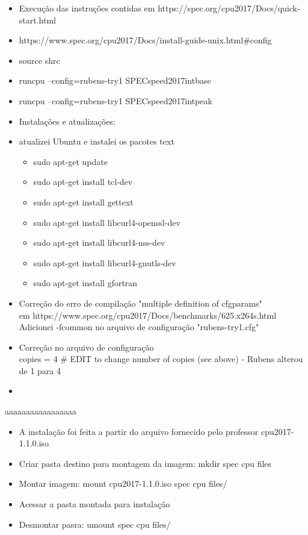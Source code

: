 \begin{itemize}
    \item Execução das instruções contidas em https://spec.org/cpu2017/Docs/quick-start.html
    \item https://www.spec.org/cpu2017/Docs/install-guide-unix.html\#config
    \item source shrc
    \item runcpu --config=rubens-try1 SPECspeed2017\textunderscore int\textunderscore base
    \item runcpu --config=rubens-try1 SPECspeed2017\textunderscore int\textunderscore peak
    \item Instalações e atualizações:
    \item atualizei Ubuntu e instalei os pacotes text
    \begin{itemize}
        \item sudo apt-get update
        \item sudo apt-get install tcl-dev
        \item sudo apt-get install gettext
        \item sudo apt-get install libcurl4-openssl-dev 
        \item sudo apt-get install libcurl4-nss-dev 
        \item sudo apt-get install libcurl4-gnutls-dev
        \item sudo apt-get install gfortran
    \end{itemize}

    \item Correção do erro de compilação "multiple definition of cfgparams"  \\
    em https://www.spec.org/cpu2017/Docs/benchmarks/625.x264\textunderscore s.html
    Adicionei -fcommon no arquivo de configuração "rubens-try1.cfg"
    \item Correção no arquivo de configuração \\
    copies           = 4   \# EDIT to change number of copies (see above) - Rubens alterou de 1 para 4 
    \item 
\end{itemize}

aaaaaaaaaaaaaaaaa


\begin{itemize}
    \item A instalação foi feita a partir do arquivo fornecido pelo professor cpu2017-1.1.0.iso 
    \item Criar pasta destino para montagem da imagem: mkdir spec \textunderscore cpu  \textunderscore files
    \item Montar imagem: mount cpu2017-1.1.0.iso  spec \textunderscore cpu  \textunderscore files/
    \item Acessar a pasta montada para instalação
    \item Desmontar pasra: umount spec \textunderscore cpu  \textunderscore files/
\end{itemize}


